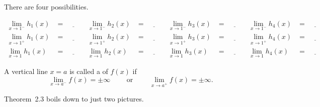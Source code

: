 \documentclass[../main.tex]{subfiles}
\begin{document}
There are four possibilities.
\begin{center}
  
  
  
  
\end{center}
\begin{align*}
  \lim_{x \to 1^{-}} h_{1}(x) 
    &= \underline{\hspace{1cm}} 
    & \lim_{x \to 1^{-}} h_{2}(x) 
    &= \underline{\hspace{1cm}} 
    & \lim_{x \to 1^{-}} h_{3}(x) 
    &= \underline{\hspace{1cm}} 
    & \lim_{x \to 1^{-}} h_{4}(x) 
    &= \underline{\hspace{1cm}} \\[2ex]
    \lim_{x \to 1^{+}} h_{1}(x) 
    &= \underline{\hspace{1cm}} 
    & \lim_{x \to 1^{+}} h_{2}(x) 
    &= \underline{\hspace{1cm}} 
    & \lim_{x \to 1^{+}} h_{3}(x) 
    &= \underline{\hspace{1cm}} 
    & \lim_{x \to 1^{+}} h_{4}(x) 
    &= \underline{\hspace{1cm}} \\[2ex]
    \lim_{x \to 1} h_{1}(x) 
    &= \underline{\hspace{1cm}} 
    & \lim_{x \to 1} h_{2}(x) 
    &= \underline{\hspace{1cm}} 
    & \lim_{x \to 1} h_{3}(x) 
    &= \underline{\hspace{1cm}} 
    & \lim_{x \to 1} h_{4}(x) 
    &= \underline{\hspace{1cm}}
\end{align*}

A vertical line \(x = a\) is called a  of \(f(x)\) if
\[
  \lim_{x \to a^{-}} f(x) = \pm \infty \qquad\text{ or }\qquad \lim_{x \to a^{+}} f(x) = \pm \infty.
\]
\clearpage

Theorem~2.3 boils down to just two pictures.
\begin{center}
  
  \qquad
  
\end{center}

\end{document}
